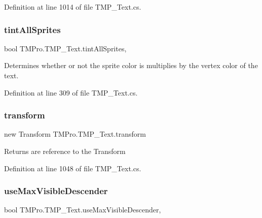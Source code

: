Definition at line 1014 of file T\+M\+P\+\_\+\+Text.\+cs.

\mbox{\label{class_t_m_pro_1_1_t_m_p___text_a3af8d969cc20cf4fac2b48fc057737a1}} 
\subsubsection{\texorpdfstring{tintAllSprites}{tintAllSprites}}
{\footnotesize\ttfamily bool T\+M\+Pro.\+T\+M\+P\+\_\+\+Text.\+tint\+All\+Sprites\hspace{0.3cm}{\ttfamily [get]}, {\ttfamily [set]}}



Determines whether or not the sprite color is multiplies by the vertex color of the text. 



Definition at line 309 of file T\+M\+P\+\_\+\+Text.\+cs.

\mbox{\label{class_t_m_pro_1_1_t_m_p___text_aa0aea09b889f063a8bea42ab981d0569}} 
\subsubsection{\texorpdfstring{transform}{transform}}
{\footnotesize\ttfamily new Transform T\+M\+Pro.\+T\+M\+P\+\_\+\+Text.\+transform\hspace{0.3cm}{\ttfamily [get]}}



Returns are reference to the Transform 



Definition at line 1048 of file T\+M\+P\+\_\+\+Text.\+cs.

\mbox{\label{class_t_m_pro_1_1_t_m_p___text_a4c2000ddd0b1c55d4804c6a458952776}} 
\subsubsection{\texorpdfstring{useMaxVisibleDescender}{useMaxVisibleDescender}}
{\footnotesize\ttfamily bool T\+M\+Pro.\+T\+M\+P\+\_\+\+Text.\+use\+Max\+Visible\+Descender\hspace{0.3cm}{\ttfamily [get]}, {\ttfamily [set]}}




